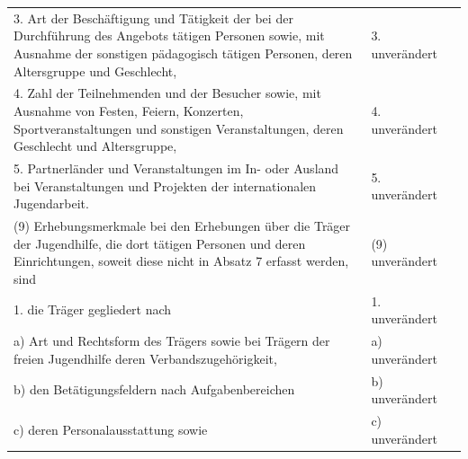 \documentclass[10pt,a4paper,landscape]{article}
\begin{document}
\begin{longtable}{|L{8.2cm}|L{8.2cm}|L{8.2cm}|}
\hhline{|---|}
3.   \newline Art der Beschäftigung und Tätigkeit der bei  \newline der Durchführung des Angebots tätigen  \newline Personen sowie, mit Ausnahme der  \newline sonstigen pädagogisch tätigen Personen,  \newline deren Altersgruppe und Geschlecht, & 3. unverändert &  \\
\hhline{|---|}
4.   \newline Zahl der Teilnehmenden und der Besucher  \newline sowie, mit Ausnahme von Festen, Feiern,  \newline Konzerten, Sportveranstaltungen und  \newline sonstigen Veranstaltungen, deren  \newline Geschlecht und Altersgruppe, & 4. unverändert &  \\
\hhline{|---|}
5.   \newline Partnerländer und Veranstaltungen im In-  \newline oder Ausland bei Veranstaltungen und  \newline Projekten der internationalen Jugendarbeit. & 5. unverändert &  \\
\hhline{|---|}
(9) Erhebungsmerkmale bei den  \newline Erhebungen über die Träger der  \newline Jugendhilfe, die dort tätigen Personen und  \newline deren Einrichtungen, soweit diese nicht in  \newline Absatz 7 erfasst werden, sind & (9) unverändert &  \\
\hhline{|---|}
1.   \newline die Träger gegliedert nach & 1. unverändert &  \\
\hhline{|---|}
a)   \newline Art und Rechtsform des Trägers sowie bei  \newline Trägern der freien Jugendhilfe deren  \newline Verbandszugehörigkeit, & a) unverändert &  \\
\hhline{|---|}
b)   \newline den Betätigungsfeldern nach  \newline Aufgabenbereichen & b) unverändert &  \\
\hhline{|---|}
c)   \newline deren Personalausstattung sowie & c) unverändert &  \\

\end{longtable}
\end{document}
